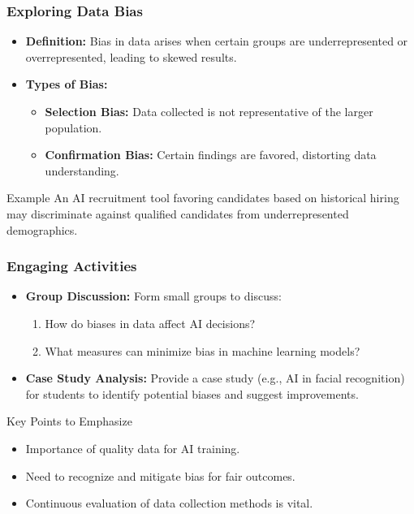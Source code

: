 \documentclass[aspectratio=169]{beamer}
\begin{document}
\begin{frame}[fragile]
    \frametitle{Exploring Data Bias}
    \begin{itemize}
        \item \textbf{Definition:} Bias in data arises when certain groups are underrepresented or overrepresented, leading to skewed results.
        \item \textbf{Types of Bias:} 
        \begin{itemize}
            \item \textbf{Selection Bias:} Data collected is not representative of the larger population.
            \item \textbf{Confirmation Bias:} Certain findings are favored, distorting data understanding.
        \end{itemize}
    \end{itemize}
    \begin{block}{Example}
        An AI recruitment tool favoring candidates based on historical hiring may discriminate against qualified candidates from underrepresented demographics.
    \end{block}
\end{frame}

\begin{frame}[fragile]
    \frametitle{Engaging Activities}
    \begin{itemize}
        \item \textbf{Group Discussion:} Form small groups to discuss:
        \begin{enumerate}
            \item How do biases in data affect AI decisions?
            \item What measures can minimize bias in machine learning models?
        \end{enumerate}
        \item \textbf{Case Study Analysis:} Provide a case study (e.g., AI in facial recognition) for students to identify potential biases and suggest improvements.
    \end{itemize}
    \begin{block}{Key Points to Emphasize}
        \begin{itemize}
            \item Importance of quality data for AI training.
            \item Need to recognize and mitigate bias for fair outcomes.
            \item Continuous evaluation of data collection methods is vital.
        \end{itemize}
    \end{block}
\end{frame}
\end{document}
